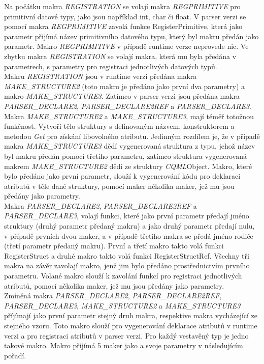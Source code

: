 \documentclass[11pt,twoside,a4paper]{book}
\begin{document}
Na počátku makra \textit{REGISTRATION} se volají makra \textit{REGPRIMITIVE} pro primitivní datové typy, jako jsou například int, char či float. V parser verzi se pomocí makra \textit{REGPRIMITIVE} zavolá funkce RegisterPrimitive, která jako parametr přijímá název primitivního datového typu, který byl makru předán jako parametr. Makro \textit{REGPRIMITIVE} v případě runtime verze neprovede nic. Ve zbytku makra \textit{REGISTRATION} se volají makra, která mu byla předána v parametrech, s parametry pro registraci jednotlivých datových typů.\\
Makru \textit{REGISTRATION} jsou v runtime verzi předána makra \textit{MAKE\_STRUCTURE2} (toto makro je předáno jako první dva parametry) a makro \textit{MAKE\_STRUCTURE3}. Zatímco v parser verzi jsou předána makra \textit{PARSER\_DECLARE2}, \textit{PARSER\_DECLARE2REF} a \textit{PARSER\_DECLARE3}.\\
Makra \textit{MAKE\_STRUCTURE2} a \textit{MAKE\_STRUCTURE3}, mají téměř totožnou funkčnost. Vytvoří tělo struktury s definovaným názvem, konstruktorem a metodou \textit{Get} pro získání libovolného atributu. Jedinným rozdílem je, že v případě makra \textit{MAKE\_STRUCTURE3} dědí vygenerovaná struktura z typu, jehož název byl makru předán pomocí třetího parametru, zatímco struktura vygenerovaná makrem \textit{MAKE\_STRUCTURE2} dědí ze struktury \textit{CQML}Object. Makro, které bylo předáno jako první parametr, slouží k vygenerování kódu pro deklaraci atributů v těle dané struktury, pomocí maker několika maker, jež mu jsou předány jako parametry.\\
Makra \textit{PARSER\_DECLARE2}, \textit{PARSER\_DECLARE2REF} a \textit{PARSER\_DECLARE3}, volají funkci, které jako první parametr předají jméno struktury (druhý parametr předaný makru) a jako druhý parametr předají nulu, v případě prvních dvou maker, a v případě třetího makra se předá jméno rodiče (třetí parametr předaný makru). První a třetí makro takto volá funkci RegisterStruct a druhé makro takto volá funkci RegisterStructRef. Všechny tři makra na závěr zavolají makro, jenž jim bylo předáno prostřednictvím prvního parametru. Volané makro slouží k zavolání funkcí pro registraci jednotlivých atributů, pomocí několika maker, jež mu jsou předány jako parametry.\\
Zmíněná makra \textit{PARSER\_DECLARE2}, \textit{PARSER\_DECLARE2REF}, \textit{PARSER\_DECLARE3}, \textit{MAKE\_STRUCTURE2} a \textit{MAKE\_STRUCTURE3} příjímají jako první parametr stejný druh makra, respektive makra vycházející ze stejného vzoru. Toto makro slouží pro vygenerování deklarace atributů v runtime verzi a pro registraci atributů v parser verzi. Pro každý vestavěný typ je jedno takové makro. Makro přijímá 5 maker jako a svoje parametry v následujícím pořadí.
\end{document}
